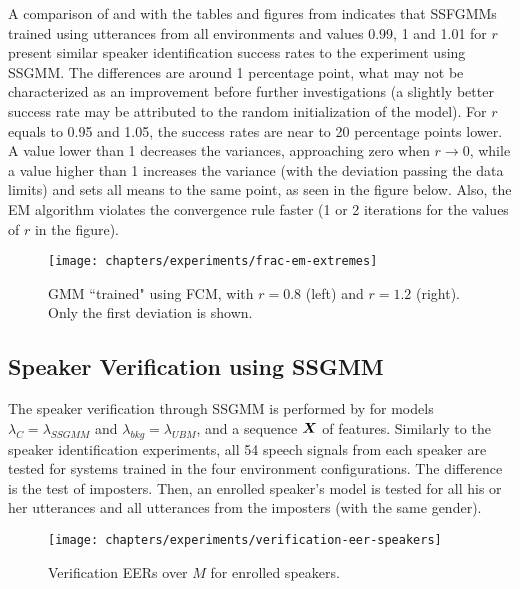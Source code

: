 A comparison of  and  with the tables and figures from  indicates that SSFGMMs trained using utterances from all environments and values 0.99, 1 and 1.01 for $r$ present similar speaker identification success rates to the experiment using SSGMM. The differences are around 1 percentage point, what may not be characterized as an improvement before further investigations (a slightly better success rate may be attributed to the random initialization of the model). For $r$ equals to 0.95 and 1.05, the success rates are near to 20 percentage points lower. A value lower than 1 decreases the variances, approaching zero when $r \to 0$, while a value higher than 1 increases the variance (with the deviation passing the data limits) and sets all means to the same point, as seen in the figure below. Also, the EM algorithm violates the convergence rule faster (1 or 2 iterations for the values of $r$ in the figure).

\begin{figure}[ht]
    \centering
    \texttt{[image: chapters/experiments/frac-em-extremes]}
    \caption{GMM ``trained" using FCM, with $r = 0.8$ (left) and $r = 1.2$ (right). Only the first deviation is shown.}
    \label{fig:frac-em-extremes}
\end{figure}

\subsection{Speaker Verification using SSGMM}

The speaker verification through SSGMM is performed by  for models $\lambda_C = \lambda_{SSGMM}$ and $\lambda_{bkg} = \lambda_{UBM}$, and a sequence $\boldsymbol{X}$ of features. Similarly to the speaker identification experiments, all 54 speech signals from each speaker are tested for systems trained in the four environment configurations. The difference is the test of imposters. Then, an enrolled speaker's model is tested for all his or her utterances and all utterances from the imposters (with the same gender).



\begin{figure}[ht]
    \centering
    \texttt{[image: chapters/experiments/verification-eer-speakers]}
    \caption{Verification EERs over $M$ for enrolled speakers.}
    \label{fig:verification-eer-speakers}
\end{figure}

